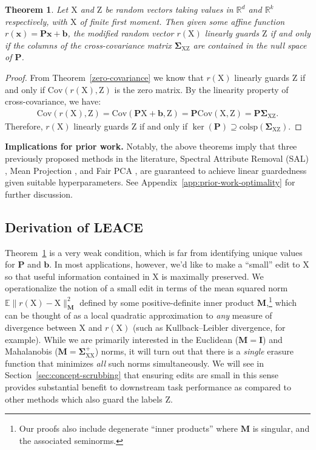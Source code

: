 \documentclass{article}
\theoremstyle{plain}
\newtheorem{theorem}{Theorem}[section]
\theoremstyle{remark}
\newcommand{\sxx}{\mathbf \Sigma_{\rv X \rv X}}
\newcommand{\sxz}{\mathbf \Sigma_{\rv X \rv Z}}
\newcommand{\E}{\mathbb E}
\newcommand{\xx}{\boldsymbol{x}}
\theoremstyle{plain}
\theoremstyle{TheoremNum}
\newcommand{\rv}[1]{{\mathrm{#1}}}
\begin{document}
\begin{theorem}\label{erasure-family}
    Let $\rv X$ and $\rv Z$ be random vectors taking values in $\mathbb R^d$ and $\mathbb R^k$ respectively, with $\rv X$ of finite first moment. Then given some affine function $r(\xx) = \mathbf{P}\xx + \mathbf{b}$, the modified random vector $r(\rv X)$ linearly guards $\rv Z$ if and only if the columns of the cross-covariance matrix $\sxz$ are contained in the null space of $\mathbf{P}$.
\end{theorem}

\begin{proof}
    From Theorem~\ref{zero-covariance} we know that $r(\rv X)$ linearly guards $\rv Z$ if and only if $\mathrm{Cov}(r(\rv X), \rv Z)$ is the zero matrix. By the linearity property of cross-covariance, we have:
    \begin{align*}
        \mathrm{Cov}(r(\rv X), \rv Z) = \mathrm{Cov}(\mathbf{P}\rv X + \mathbf{b}, \rv Z) = \mathbf{P}\mathrm{Cov}(\rv X, \rv Z) = \mathbf{P}\sxz.
    \end{align*}
    Therefore, $r(\rv X)$ linearly guards $\rv Z$ if and only if $\ker(\mathbf{P}) \supseteq \mathrm{colsp}(\sxz)$.
\end{proof}

\textbf{Implications for prior work.}
Notably, the above theorems imply that three previously proposed methods in the literature, Spectral Attribute Removal (SAL) \cite{shao-etal-2023-gold}, Mean Projection \cite{haghighatkhah2022better}, and Fair PCA \cite{kleindessner2023efficient}, are guaranteed to achieve linear guardedness given suitable hyperparameters. See Appendix~\ref{app:prior-work-optimality} for further discussion.

\subsection{Derivation of LEACE}\label{sec:least-squares-soln}

Theorem~\ref{erasure-family} is a very weak condition, which is far from identifying unique values for $\mathbf{P}$ and $\mathbf{b}$. In most applications, however, we'd like to make a ``small'' edit to $\rv X$ so that useful information contained in $\rv X$ is maximally preserved. We operationalize the notion of a small edit in terms of the mean squared norm $\E \| r(\rv X) - \rv X \|^2_{\mathbf M}$ defined by some positive-definite inner product $\mathbf M$,\footnote{Our proofs also include degenerate ``inner products'' where $\mathbf{M}$ is singular, and the associated seminorms.} which can be thought of as a local quadratic approximation to \textit{any} measure of divergence between $\rv X$ and $r(\rv X)$ (such as Kullback–Leibler divergence, for example). While we are primarily interested in the Euclidean ($\mathbf{M} = \mathbf{I}$) and Mahalanobis ($\mathbf{M} = \sxx^+$) norms, it will turn out that there is a \emph{single} erasure function that minimizes \emph{all} such norms simultaneously. We will see in Section~\ref{sec:concept-scrubbing} that ensuring edits are small in this sense provides substantial benefit to downstream task performance as compared to other methods which also guard the labels $\rv Z$.
\end{document}
